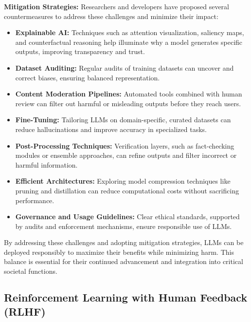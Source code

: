 \begin{flushleft}
    \textbf{Mitigation Strategies:}
    Researchers and developers have proposed several countermeasures to address these challenges and minimize their impact:
    \begin{itemize}
        \item \textbf{Explainable AI:} Techniques such as attention visualization, saliency maps, and counterfactual reasoning help illuminate why a model generates specific outputs, improving transparency and trust.
        \item \textbf{Dataset Auditing:} Regular audits of training datasets can uncover and correct biases, ensuring balanced representation.
        \item \textbf{Content Moderation Pipelines:} Automated tools combined with human review can filter out harmful or misleading outputs before they reach users.
        \item \textbf{Fine-Tuning:} Tailoring LLMs on domain-specific, curated datasets can reduce hallucinations and improve accuracy in specialized tasks.
        \item \textbf{Post-Processing Techniques:} Verification layers, such as fact-checking modules or ensemble approaches, can refine outputs and filter incorrect or harmful information.
        \item \textbf{Efficient Architectures:} Exploring model compression techniques like pruning and distillation can reduce computational costs without sacrificing performance.
        \item \textbf{Governance and Usage Guidelines:} Clear ethical standards, supported by audits and enforcement mechanisms, ensure responsible use of LLMs.
    \end{itemize}

    By addressing these challenges and adopting mitigation strategies, LLMs can be deployed responsibly to maximize their benefits while minimizing harm. This balance is essential for their continued advancement and integration into critical societal functions.
\end{flushleft}



\subsection{Reinforcement Learning with Human Feedback (RLHF)}

